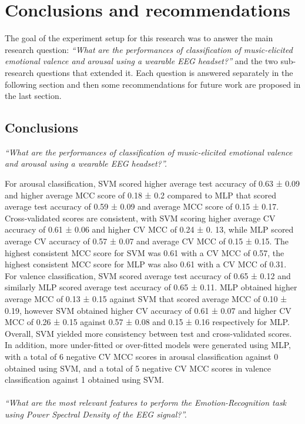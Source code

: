 \chapter{Conclusions and recommendations}
\label{chap:conclusions}
The goal of the experiment setup for this research was to answer the main research question: \emph{“What are the performances of classification of music-elicited emotional valence and arousal using a wearable EEG headset?”} and the two sub-research questions that extended it. Each question is answered separately in the following section and then some recommendations for future work are proposed in the last section.
\section{Conclusions}
\label{sec:conclusions}
\emph{“What are the performances of classification of music-elicited emotional valence and arousal using a wearable EEG headset?”. }

For arousal classification, \ac{SVM} scored higher average test accuracy of 0.63 ± 0.09 and higher average \ac{MCC} score of 0.18 ± 0.2 compared to \ac{MLP} that scored average test accuracy of 0.59 ± 0.09 and average \ac{MCC} score of 0.15 ± 0.17. Cross-validated scores are consistent, with \ac{SVM} scoring higher average CV accuracy of 0.61 ± 0.06 and higher \ac{CV MCC} of 0.24 ± 0. 13, while \ac{MLP} scored average CV accuracy of 0.57 ± 0.07 and average \ac{CV MCC} of 0.15 ± 0.15. The highest consistent \ac{MCC} score for \ac{SVM} was 0.61 with a \ac{CV MCC} of 0.57, the highest consistent \ac{MCC} score for \ac{MLP} was also 0.61 with a \ac{CV} \ac{MCC} of 0.31. For valence classification, \ac{SVM} scored average test accuracy of 0.65 ± 0.12 and similarly \ac{MLP} scored average test accuracy of 0.65 ± 0.11. \ac{MLP} obtained higher average \ac{MCC} of 0.13 ± 0.15 against \ac{SVM} that scored average \ac{MCC} of 0.10 ± 0.19, however \ac{SVM} obtained higher CV accuracy of 0.61 ± 0.07 and higher \ac{CV} \ac{MCC} of 0.26 ± 0.15 against 0.57 ± 0.08 and 0.15 ± 0.16 respectively for \ac{MLP}. Overall, \ac{SVM} yielded more consistency between test and cross-validated scores. In addition, more under-fitted or over-fitted models were generated using \ac{MLP}, with a total of 6 negative \ac{CV MCC} scores in arousal classification against 0 obtained using \ac{SVM}, and a total of 5 negative \ac{CV MCC} scores in valence classification against 1 obtained using \ac{SVM}.
\\
\\
\emph{“What are the most relevant features to perform the Emotion-Recognition task using Power Spectral Density of the EEG signal?”.}

